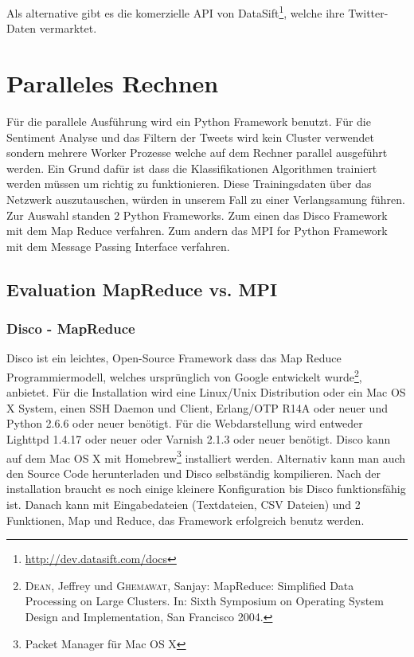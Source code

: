 \documentclass[12pt, oneside]{report}   	%
\begin{document}
Als alternative gibt es die komerzielle API von DataSift\footnote{\url{http://dev.datasift.com/docs}}, welche ihre Twitter-Daten vermarktet.

\section{Paralleles Rechnen}
Für die parallele Ausführung wird ein Python Framework benutzt. Für die Sentiment Analyse und das Filtern der Tweets wird kein Cluster verwendet sondern mehrere Worker Prozesse welche auf dem Rechner parallel ausgeführt werden. Ein Grund dafür ist dass die Klassifikationen Algorithmen trainiert werden müssen um richtig zu funktionieren. Diese Trainingsdaten über das Netzwerk auszutauschen, würden in unserem Fall zu einer Verlangsamung führen.
Zur Auswahl standen 2 Python Frameworks. Zum einen das Disco Framework mit dem Map Reduce verfahren. Zum andern das  MPI for Python Framework mit dem Message Passing Interface verfahren.

\subsection{Evaluation MapReduce vs. MPI}
\subsubsection{Disco - MapReduce}
Disco ist ein leichtes, Open-Source Framework dass das Map Reduce Programmiermodell, welches ursprünglich von Google entwickelt wurde\footnote{\textsc{Dean}, Jeffrey und \textsc{Ghemawat}, Sanjay: MapReduce: Simplified Data Processing on Large Clusters. In: Sixth Symposium on Operating System Design and Implementation, San Francisco 2004.}, anbietet. Für die Installation wird eine Linux/Unix Distribution oder ein Mac OS X System, einen SSH Daemon und Client, Erlang/OTP R14A oder neuer und Python 2.6.6 oder neuer benötigt. Für die Webdarstellung wird entweder Lighttpd 1.4.17 oder neuer oder Varnish 2.1.3 oder neuer benötigt. Disco kann auf dem Mac OS X mit Homebrew\footnote{Packet Manager für Mac OS X} installiert werden. Alternativ kann man auch den Source Code herunterladen und Disco selbständig kompilieren. Nach der installation braucht es noch einige kleinere Konfiguration bis Disco funktionsfähig ist. Danach kann mit Eingabedateien (Textdateien, CSV Dateien) und 2 Funktionen, Map und Reduce, das Framework erfolgreich benutz werden.
\end{document}
